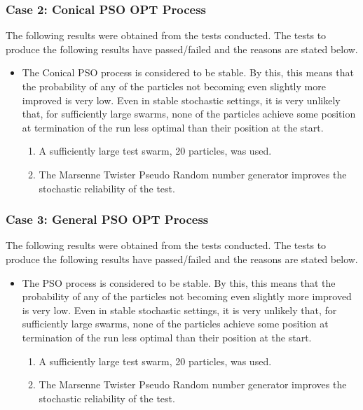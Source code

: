 \documentclass[11pt]{article}
\begin{document}
\subsubsection{Case 2: Conical PSO OPT Process}
The following results were obtained from the tests conducted. The tests to produce the
following results have passed/failed and the reasons are stated below.
\begin{itemize}

\item The Conical PSO process is considered to be stable. By this, this means that the probability of any of the particles not becoming even slightly more improved is very low. Even in stable stochastic settings, it is very unlikely that, for sufficiently large swarms, none of the particles achieve some position at termination of the run less optimal than their position at the start.
	\begin{enumerate}
	\item A sufficiently large test swarm, 20 particles, was used.
	\item The Marsenne Twister Pseudo Random number generator improves the stochastic reliability of the test.
	\end{enumerate}
\end{itemize}		

\subsubsection{Case 3: General PSO OPT Process}
The following results were obtained from the tests conducted. The tests to produce the
following results have passed/failed and the reasons are stated below.
\begin{itemize}
\item The PSO process is considered to be stable. By this, this means that the probability of any of the particles not becoming even slightly more improved is very low. Even in stable stochastic settings, it is very unlikely that, for sufficiently large swarms, none of the particles achieve some position at termination of the run less optimal than their position at the start.
	\begin{enumerate}
		\item A sufficiently large test swarm, 20 particles, was used.
	\item The Marsenne Twister Pseudo Random number generator improves the stochastic reliability of the test.

	\end{enumerate}
	\end{itemize}
\end{document}
